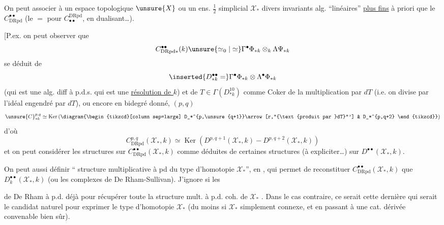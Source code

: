 
 On peut associer à un espace topologique $\unsure{X}$ ou un ens. $\frac12$ simplicial $\mathcal X_*$ divers invariants alg.  ``linéaires'' \uline{plus fins} à priori que le $C^{\bullet\bullet}_{\mathrm{DRpd}}$ (le $=$ pour $C_{\bullet\bullet}^{\mathrm{DRpd}}$, en dualisant\dots).

[P.ex. on peut observer que
\[
C^{\bullet\bullet}_{\mathrm{DRpd}*}(k)\unsure{\simeq_0|\simeq}\Gamma^\bullet\Phi_{*k}\otimes_k\Lambda\Psi_{*k}
\]
se déduit de
\[
\inserted{D^{\bullet\bullet}_{*k}=}\Gamma^\bullet\Phi_{*k}\otimes\Lambda^\bullet\Phi_{*k}
\]
(qui est une alg. diff  à p.d.s. qui est une \uline{résolution de $k$}) et de $T\in\Gamma(D^{10}_{*k})$ comme Coker de la multiplication par $dT$ (i.e. on divise par l'idéal engendré par $dT$), ou encore en bidegré donné,  $(p,q)$
\[
\unsure{C}^{p,q}_{*k}\simeq\operatorname{Ker}\left(\diagram{\begin{tikzcd}[column sep=large]
D_*^{p,\unsure{q+1}}\arrow[r,"{\text{produit par }dT}"'] & D_*^{p,q+2}
\end{tikzcd}}\right)
\]
d'où
\[
C^{p,q}_{\mathrm{DRpd}}(\mathcal X_*,k)\simeq\operatorname{Ker}(D^{p,q+1}(\mathcal X_*,k)-D^{p,q+2}(\mathcal X_*,k))
\]
et on peut considérer les structures  sur $C^{\bullet\bullet}_{\mathrm{DRpd}}(\mathcal X_*,k)$ comme déduites de certaines structures (à expliciter\dots) sur $D^{\bullet\bullet}(\mathcal X_*,k)$.

On peut aussi définir `` structure multiplicative à pd  du type d'homotopie $\mathcal X_*$'', en , qui permet de reconstituer   $C^{\bullet\bullet}_{\mathrm{DRpd}}(\mathcal X_*,k)$ que $D^{\bullet\bullet}_k(\mathcal X_*,k)$ (ou les complexes de De Rham-Sullivan). J'ignore si les


 de De Rham à p.d.   déjà pour récupérer toute la structure mult. à p.d. coh. de $\mathcal X_*$ . Dans le cas contraire, ce serait cette dernière qui serait le candidat  naturel pour exprimer le type d'homotopie $\mathcal X_*$ (du moins si $\mathcal X_*$  simplement connexe, et en passant à une cat. dérivée convenable bien sûr).

